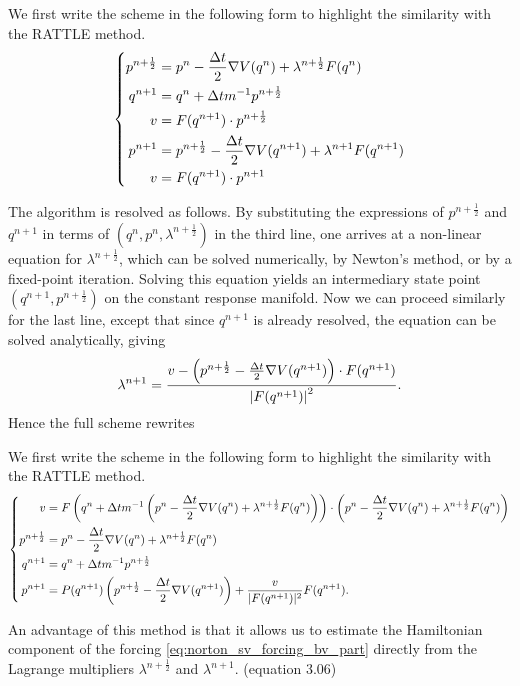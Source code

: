 We first write the scheme in the following form to highlight the similarity with the RATTLE method.
    \begin{equation}
    \left\{
        \begin{aligned}
            p^{n+\frac12}&=p^{n}-\frac{{\Delta t}}2\nabla V(q^n)+\lambda^{n+\frac12}F(q^n)\\
            q^{n+1}&=q^n+{\Delta t} m^{-1} p^{n+\frac12}\\
            v&=F(q^{n+1})\cdot p^{n+\frac12}\\
            p^{n+1}&=p^{n+\frac12}-\frac{{\Delta t}}2\nabla V(q^{n+1})+\lambda^{n+1}F(q^{n+1})\\
            v&=F(q^{n+1})\cdot p^{n+1}
        \end{aligned}
    \right.
    \end{equation}

The algorithm is resolved as follows. By substituting the expressions of $p^{n+\frac12}$ and $q^{n+1}$ in terms of $(q^n,p^n,\lambda^{n+\frac12})$ in the third line, one arrives at a non-linear equation for $\lambda^{n+\frac12}$, which can be solved numerically, by Newton's method, or by a fixed-point iteration.
Solving this equation yields an intermediary state point $(q^{n+1},p^{n+\frac12})$ on the constant response manifold. Now we can proceed similarly for the last line, except that since $q^{n+1}$ is already resolved, the equation can be solved analytically, giving
\begin{equation}
    \lambda^{n+1}=\frac{v-\left(p^{n+\frac12}-\frac{{\Delta t}}2\nabla V(q^{n+1})\right)\cdot F(q^{n+1})}{\left|F(q^{n+1})\right|^2}.
\end{equation}
Hence the full scheme rewrites 
\begin{algorithm}
    We first write the scheme in the following form to highlight the similarity with the RATTLE method.
    \begin{equation}
    \left\{
        \begin{aligned}
            v&=F\left(q^n+{\Delta t} m^{-1}\left(p^{n}-\frac{{\Delta t}}2\nabla V(q^n)+\lambda^{n+\frac12}F(q^n)\right)\right)\cdot \left(p^{n}-\frac{{\Delta t}}2\nabla V(q^n)+\lambda^{n+\frac12}F(q^n)\right)\\
            p^{n+\frac12}&=p^{n}-\frac{{\Delta t}}2\nabla V(q^n)+\lambda^{n+\frac12}F(q^n)\\
            q^{n+1}&=q^n+{\Delta t} m^{-1} p^{n+\frac12}\\
            p^{n+1}&=P(q^{n+1})\left(p^{n+\frac12}-\frac{{\Delta t}}2\nabla V(q^{n+1})\right)+\frac{v}{|F(q^{n+1})|^2}F(q^{n+1}).\\
        \end{aligned}
    \right.
    \end{equation}
\end{algorithm}

An advantage of this method is that it allows us to estimate the Hamiltonian component of the forcing \eqref{eq:norton_sv_forcing_bv_part} directly from the Lagrange multipliers $\lambda^{n+\frac12}$ and $\lambda^{n+1}$.
(equation 3.06)
